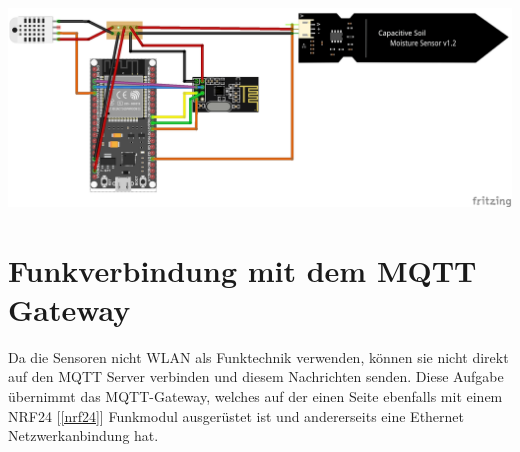 \documentclass[
  12pt, %
  a4paper, %
  oneside, %
  openany, 
  numbers=noenddot, %
  BCOR=5mm, %
  parskip=half*, %
  thesis, %
]{bfhbook}
\begin{document}
  \begin{center}
    \includegraphics[width=17cm, left]{Bilder/Sensor-Design_Steckplatine.png}
    \captionsetup{justification=centering}
   \end{center}


 \section{Funkverbindung mit dem MQTT Gateway}
 Da die Sensoren nicht WLAN als Funktechnik verwenden, können sie nicht direkt auf den MQTT Server verbinden und diesem Nachrichten senden. Diese Aufgabe übernimmt das MQTT-Gateway, welches auf der einen Seite ebenfalls mit einem NRF24 [\ref{nrf24}] Funkmodul ausgerüstet ist und andererseits eine Ethernet Netzwerkanbindung hat.
 
\end{document}
